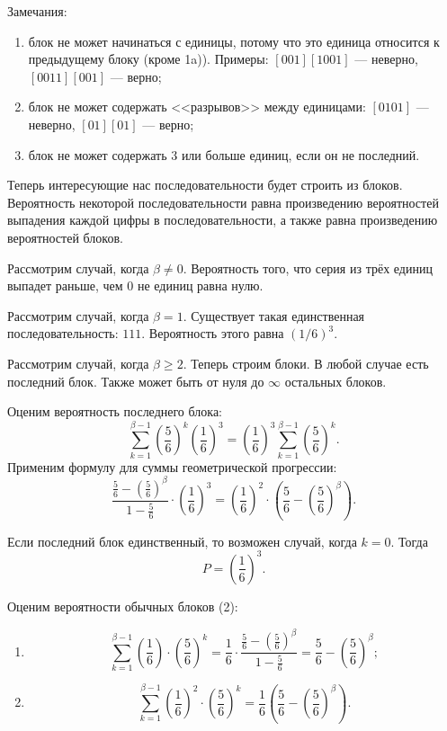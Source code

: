 Замечания:
\begin{enumerate}
\item блок не может начинаться с единицы, потому что это единица относится к предыдущему блоку (кроме 1a)).
Примеры: $ \left[ 001 \right] \left[ 1001 \right] $ --- неверно, $ \left[ 0011 \right] \left[ 001 \right] $ --- верно;
\item блок не может содержать <<разрывов>> между единицами: $ \left[ 0101 \right] $ --- неверно,
$ \left[ 01 \right] \left[ 01 \right] $ --- верно;
\item блок не может содержать 3 или больше единиц, если он не последний.
\end{enumerate}

Теперь интересующие нас последовательности будет строить из блоков.
Вероятность некоторой последовательности равна произведению вероятностей выпадения каждой цифры в последовательности,
а также равна произведению вероятностей блоков.

Рассмотрим случай, когда $ \beta \neq 0$.
Вероятность того, что серия из трёх единиц выпадет раньше, чем 0 не единиц равна нулю.

Рассмотрим случай, когда $ \beta = 1$.
Существует такая единственная последовательность: $111$.
Вероятность этого равна $ \left( 1/6 \right)^3$.

Рассмотрим случай, когда $ \beta \geq 2$.
Теперь строим блоки.
В любой случае есть последний блок.
Также может быть от нуля до $ \infty $ остальных блоков.

Оценим вероятность последнего блока:
$$ \sum \limits_{k=1}^{ \beta - 1} \left( \frac{5}{6} \right)^k \left( \frac{1}{6} \right)^3 =
\left( \frac{1}{6} \right)^3 \sum \limits_{k=1}^{ \beta -1} \left( \frac{5}{6} \right)^k.$$
Применим формулу для суммы геометрической прогрессии:
$$ \frac{ \frac{5}{6} - \left( \frac{5}{6} \right)^{ \beta }}{1 - \frac{5}{6}} \cdot \left( \frac{1}{6} \right)^3 =
\left( \frac{1}{6} \right)^2 \cdot \left( \frac{5}{6} - \left( \frac{5}{6} \right)^{ \beta } \right).$$

Если последний блок единственный, то возможен случай, когда $k=0$.
Тогда
$$P =
\left( \frac{1}{6} \right)^3.$$

Оценим вероятности обычных блоков (2):
\begin{enumerate}[label=\alph*)]
\item $$ \sum \limits_{k=1}^{ \beta -1} \left( \frac{1}{6} \right) \cdot \left( \frac{5}{6} \right)^k =
\frac{1}{6} \cdot \frac{ \frac{5}{6} - \left( \frac{5}{6} \right)^{ \beta }}{1 - \frac{5}{6}} =
\frac{5}{6} - \left( \frac{5}{6} \right)^{ \beta };$$
\item $$ \sum \limits_{k=1}^{ \beta -1} \left( \frac{1}{6} \right)^2 \cdot \left( \frac{5}{6} \right)^k =
\frac{1}{6} \left( \frac{5}{6} - \left( \frac{5}{6} \right)^{ \beta } \right).$$
\end{enumerate}

